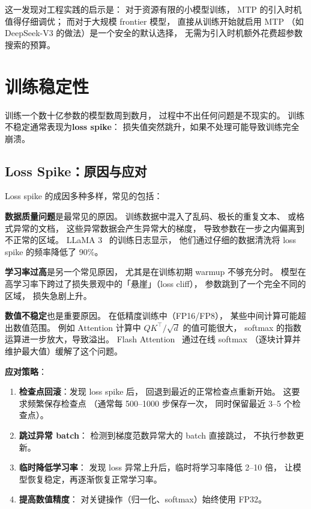 这一发现对工程实践的启示是：
对于资源有限的小模型训练，
MTP 的引入时机值得仔细调优；
而对于大规模 frontier 模型，
直接从训练开始就启用 MTP
（如 DeepSeek-V3 的做法）是一个安全的默认选择，
无需为引入时机额外花费超参数搜索的预算。

\section{训练稳定性}

训练一个数十亿参数的模型数周到数月，
过程中不出任何问题是不现实的。
训练不稳定通常表现为\textbf{loss spike}：
损失值突然跳升，如果不处理可能导致训练完全崩溃。

\subsection{Loss Spike：原因与应对}

Loss spike 的成因多种多样，常见的包括：

\textbf{数据质量问题}是最常见的原因。
训练数据中混入了乱码、极长的重复文本、
或格式异常的文档，
这些异常数据会产生异常大的梯度，
导致参数在一步之内偏离到不正常的区域。
LLaMA 3~\cite{dubey2024llama3} 的训练日志显示，
他们通过仔细的数据清洗将 loss spike 的频率降低了 90\%。

\textbf{学习率过高}是另一个常见原因，
尤其是在训练初期 warmup 不够充分时。
模型在高学习率下跨过了损失景观中的「悬崖」（loss cliff），
参数跳到了一个完全不同的区域，
损失急剧上升。

\textbf{数值不稳定}也是重要原因。
在低精度训练中（FP16/FP8），
某些中间计算可能超出数值范围。
例如 Attention 计算中 $QK^\top / \sqrt{d}$ 的值可能很大，
softmax 的指数运算进一步放大，导致溢出。
Flash Attention~\cite{dao2022flashattention} 通过在线 softmax
（逐块计算并维护最大值）缓解了这个问题。

\textbf{应对策略}：
\begin{enumerate}[noitemsep]
  \item \textbf{检查点回滚}：发现 loss spike 后，
        回退到最近的正常检查点重新开始。
        这要求频繁保存检查点
        （通常每 500--1000 步保存一次，
        同时保留最近 3--5 个检查点）。
  \item \textbf{跳过异常 batch}：
        检测到梯度范数异常大的 batch 直接跳过，
        不执行参数更新。
  \item \textbf{临时降低学习率}：
        发现 loss 异常上升后，临时将学习率降低 2--10 倍，
        让模型恢复稳定，再逐渐恢复正常学习率。
  \item \textbf{提高数值精度}：
        对关键操作（归一化、softmax）始终使用 FP32。
\end{enumerate}

